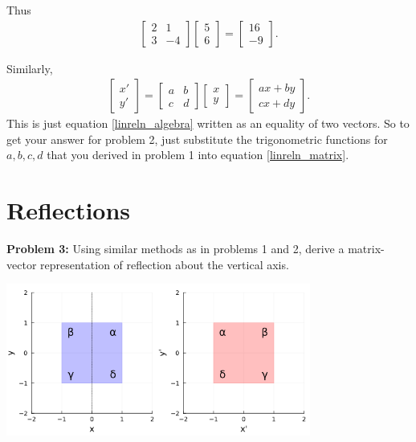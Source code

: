 \documentclass[letter]{article}
\begin{document}
Thus
\begin{align*}
  \begin{bmatrix} 2 & 1 \\ 3 & -4 \end{bmatrix}                       
  \begin{bmatrix} 5 \\ 6 \end{bmatrix}
  =
  \begin{bmatrix} 16 \\ -9\end{bmatrix}.                       
\end{align*}

Similarly, 
\begin{align}
  \begin{bmatrix} x' \\ y' \end{bmatrix}
  =
  \begin{bmatrix} a & b \\ c & d \end{bmatrix}                       
  \begin{bmatrix} x \\ y \end{bmatrix}
  =
  \begin{bmatrix} ax + by \\ cx + dy \end{bmatrix}.
\end{align}
This is just equation \ref{linreln_algebra} written as an equality of two vectors.
So to get your answer for problem 2, just substitute the trigonometric functions
for $a,b,c,d$ that you derived in problem 1 into equation \ref{linreln_matrix}.



\section{Reflections}

{\bf Problem 3:} Using similar methods as in problems 1 and 2, derive a matrix-vector
representation of reflection about the vertical axis. 

\begin{center}
\includegraphics[width=0.75\textwidth]{xreflection.png}
\end{center}
\end{document}
